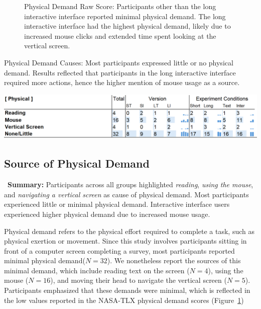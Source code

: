 \begin{figure}[h]
\begin{minipage}[t]{0.45\textwidth}
        \captionsetup{width=0.9\textwidth, justification=justified}
        \caption{Physical Demand Raw Score: Participants other than the long interactive interface reported minimal physical demand. The long interactive interface had the highest physical demand, likely due to increased mouse clicks and extended time spent looking at the vertical screen.}
        \label{fig:physical_cog_score}
    \end{minipage}
\end{figure}

\begin{table}[h]
    \caption{Physical Demand Causes: Most participants expressed little or no physical demand. Results reflected that participants in the long interactive interface required more actions, hence the higher mention of mouse usage as a source.}
    \label{tbl:physical}
    \includegraphics[width=\linewidth]{content/image/cog/physical_table.png}
\end{table}

\subsection{Source of Physical Demand} 
\label{sec:physical}

\vspace{5pt}
\begin{tldrbox}
    \faInfoCircle~\xspace\textbf{Summary:} Participants across all groups highlighted \textit{reading}, \textit{using the mouse}, and \textit{navigating a vertical screen} as cause of physical demand. Most participants experienced little or minimal physical demand. Interactive interface users experienced higher physical demand due to increased mouse usage.
\end{tldrbox}

Physical demand refers to the physical effort required to complete a task, such as physical exertion or movement. Since this study involves participants sitting in front of a computer screen completing a survey, most participants reported minimal physical demand($N=32$). We nonetheless report the sources of this minimal demand, which include reading text on the screen ($N=4$), using the mouse ($N=16$), and moving their head to navigate the vertical screen ($N=5$). Participants emphasized that these demands were minimal, which is reflected in the low values reported in the NASA-TLX physical demand scores (Figure~\ref{fig:physical_cog_score})

